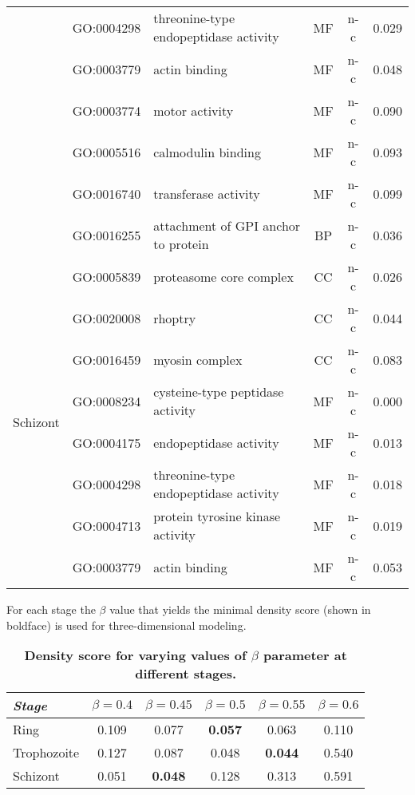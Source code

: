 \documentclass{article}
\begin{document}
\begin{table}
\begin{center}
\begin{tabular}{lllccc}
& GO:0004298 & threonine-type endopeptidase activity & MF  & n-c & 0.029\\
& GO:0003779 & actin binding & MF  & n-c & 0.048\\
& GO:0003774 & motor activity & MF  & n-c & 0.090\\
& GO:0005516 & calmodulin binding & MF  & n-c & 0.093\\
& GO:0016740 & transferase activity & MF  & n-c & 0.099\\
& GO:0016255 & attachment of GPI anchor to protein & BP & n-c & 0.036\\
\hline
\multirow{8}{*}{Schizont}
& GO:0005839 & proteasome core complex & CC & n-c & 0.026\\
& GO:0020008 & rhoptry & CC & n-c & 0.044\\
& GO:0016459 & myosin complex & CC & n-c & 0.083\\
& GO:0008234 & cysteine-type peptidase activity & MF  & n-c & 0.000\\
& GO:0004175 & endopeptidase activity & MF  & n-c & 0.013\\
& GO:0004298 & threonine-type endopeptidase activity & MF  & n-c & 0.018\\
& GO:0004713 & protein tyrosine kinase activity & MF  & n-c & 0.019\\
& GO:0003779 & actin binding & MF  & n-c & 0.053\\
\hline
\end{tabular}
\end{center}
\label{table:secondPro}
\end{table}
\clearpage

\begin{table}
\caption{{\bf Density score for varying values of $\beta$ parameter at different stages.}}
{For each stage the $\beta$ value that yields the minimal density score (shown in boldface)
is used for three-dimensional modeling.}
\vspace{10pt}
\begin{center}
\begin{tabular}{lccccc}
\hline
\emph{Stage} & $\beta = 0.4$ & $\beta = 0.45$ & $\beta = 0.5$ & $\beta = 0.55$ &
$\beta = 0.6$ \\
\hline
Ring & 0.109 & 0.077 & \textbf{0.057} & 0.063 & 0.110 \\
Trophozoite & 0.127 & 0.087 & 0.048 & \textbf{0.044} & 0.540 \\
Schizont & 0.051 & \textbf{0.048} & 0.128 & 0.313 & 0.591 \\\hline
\end{tabular}
\end{center}
\label{table:density}
\end{table}
\clearpage
\end{document}
